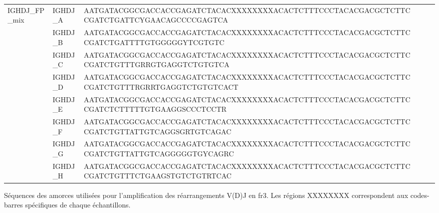 \begin{annex}[htbp]
{\begin{tabular}{lllp{7cm}rr}
IGHDJ\_FP\_mix & IGHDJ\_A & AATGATACGGCGACCACCGAGATCTACACXXXXXXXXACACTCTTTCCCTACACGACGCTCTTCCGATCTGATTCYGAACAGCCCCGAGTCA \\
& IGHDJ\_B & AATGATACGGCGACCACCGAGATCTACACXXXXXXXXACACTCTTTCCCTACACGACGCTCTTCCGATCTGATTTTGTGGGGGYTCGTGTC \\
& IGHDJ\_C & AATGATACGGCGACCACCGAGATCTACACXXXXXXXXACACTCTTTCCCTACACGACGCTCTTCCGATCTGTTTGRRGTGAGGTCTGTGTCA \\
& IGHDJ\_D & AATGATACGGCGACCACCGAGATCTACACXXXXXXXXACACTCTTTCCCTACACGACGCTCTTCCGATCTGTTTRGRRTGAGGTCTGTGTCACT \\
& IGHDJ\_E & AATGATACGGCGACCACCGAGATCTACACXXXXXXXXACACTCTTTCCCTACACGACGCTCTTCCGATCTCTTTTTGTGAAGGSCCCTCCTR \\
& IGHDJ\_F & AATGATACGGCGACCACCGAGATCTACACXXXXXXXXACACTCTTTCCCTACACGACGCTCTTCCGATCTGTTATTGTCAGGSGRTGTCAGAC \\
& IGHDJ\_G & AATGATACGGCGACCACCGAGATCTACACXXXXXXXXACACTCTTTCCCTACACGACGCTCTTCCGATCTGTTATTGTCAGGGGGTGYCAGRC \\
& IGHDJ\_H & AATGATACGGCGACCACCGAGATCTACACXXXXXXXXACACTCTTTCCCTACACGACGCTCTTCCGATCTGTTTCTGAAGSTGTCTGTRTCAC \\

\hline
\end{tabular}
}
\caption{
    Séquences des amorces utilisées pour l'amplification des réarrangements V(D)J en \gls{fr}3.
    Les régions XXXXXXXX correspondent aux codes-barres spécifiques de chaque échantillons.
    }
\label{anx:primer-sequences}
\end{annex}
